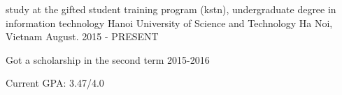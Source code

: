 


\begin{cventries}


\cventry
{study at the gifted student training program (kstn),
undergraduate degree in information technology} %
{Hanoi University of Science and Technology} %
{Ha Noi, Vietnam} %
{August. 2015 - PRESENT} %
{ %
\begin{cvitems}
\item {Got a scholarship in the second term 2015-2016}
\item {Current GPA: 3.47/4.0}
\end{cvitems}
}


\end{cventries}
